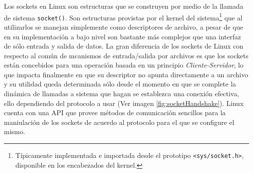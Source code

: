 Los sockets en Linux \cite{rfc:147, book:sockets} son estructuras que se construyen por medio de la llamada de sistema \verb=socket()=. Son estructuras provistas por el kernel del sistema\footnote{Típicamente implementada e importada desde el prototipo \verb=<sys/socket.h>=, disponible en los encabezados del kernel.} que al utilizarlos se manejan simplemente como descriptores de archivo, a pesar de que en su implementación a bajo nivel son bastante más complejos que una interfaz de sólo entrada y salida de datos. La gran diferencia de los sockets de Linux con respecto al común de mcanismos de entrada/salida por archivos es que los sockets están concebidos para una operación basada en un principio \emph{Cliente-Servidor}, lo que impacta finalmente en que su descriptor no apunta directamente a un archivo y su utilidad queda determinada sólo desde el momento en que se complete la dinámica de llamadas a sistema que hagan se establezca una conexión efectiva, ello dependiendo del protocolo a usar (Ver imagen \ref{fig:socketHandshake}). Linux cuenta con una API que provee métodos de comunicación sencillos para la maniulación de los sockets de acuerdo al protocolo para el que se configure el mismo.

